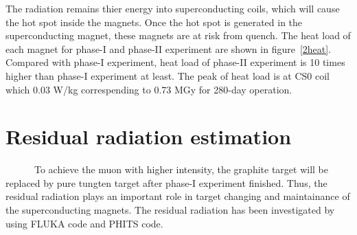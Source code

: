 The radiation remains thier energy into superconducting coils, which will cause the hot spot inside the magnets.
Once the hot spot is generated in the superconducting magnet, these magnets are at risk from quench.
The heat load of each magnet for phase-I and phase-II experiment are shown in figure~\ref{2heat}.
Compared with phase-I experiment, heat load of phase-II experiment is 10 times higher than phase-I experiment at least.
The peak of heat load is at CS0 coil which 0.03 W/kg correspending to 0.73 MGy for 280-day operation.

 \section{Residual radiation estimation}
~~~~~~To achieve the muon with higher intensity, the graphite target will be replaced by pure tungten target after phase-I experiment finished.
Thus, the residual radiation plays an important role in target changing and maintainance of the superconducting magnets.
The residual radiation has been investigated by using FLUKA code and PHITS code.


